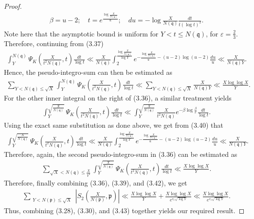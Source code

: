 \documentclass[12pt]{article}
\numberwithin{equation}{section}
\numberwithin{equation}{section}
\begin{document}
\begin{proof}
\begin{align}
     \beta = u-2;\quad t = e^{\frac{\log \frac{X}{N(\mathfrak{q})}}{u}};\quad  du = -\log \frac{X}{N(\mathfrak{q})}\frac{dt}{t(\log t)^2}. \nonumber
\end{align}
Note here that the asymptotic bound is uniform for $Y<t\leq N(\mathfrak{q})$, for $\varepsilon=\frac{2}{3}$. Therefore, continuing from (3.37)
 \begin{align}
     \int_Y^{N(\mathfrak{q})} \Psi_K\left(\frac{X}{t^2N(\mathfrak{q})},t\right)\frac{dt}{\log t} \ll \frac{X}{N(\mathfrak{q})}\int_2^{\frac{\log \frac{X}{N(\mathfrak{q})}}{\log Y}} e^{-\frac{\log \frac{X}{N(\mathfrak{q})}}{u}-(u-2)\log(u-2)}\frac{du}{u} \ll \frac{X}{N(\mathfrak{q})Y}.
 \end{align}
Hence, the pseudo-integro-sum can then be estimated as
\begin{eqnarray}
    \sum_{Y<N(\mathfrak{q})\leq \sqrt{X}} \int_Y^{N(\mathfrak{q})} \Psi_K\left(\frac{X}{t^2N(\mathfrak{q})},t\right)\frac{dt}{\log t} \ll \sum_{Y<N(\mathfrak{q}) \leq \sqrt{X}} \frac{X}{N(\mathfrak{q})Y} \ll \frac{X\log\log X}{Y}.
\end{eqnarray}
For the other inner integral on the right of (3.36), a similar treatment yields
\begin{align}
    \int_Y^{\sqrt{\frac{X}{N(\mathfrak{q})} } } \Psi_K\left(\frac{X}{t^2N(\mathfrak{q})},t\right)\frac{dt}{\log t} \ll \int_{Y}^{\sqrt{\frac{X}{N(\mathfrak{q})}}} \frac{X}{t^2N(\mathfrak{q})}e^{-\beta\log\frac{\beta}{e}}\frac{dt}{\log t}.
\end{align}
Using the exact same substitution as done above, we get from (3.40) that
\begin{align}
    \int_Y^{\sqrt{\frac{X}{N(\mathfrak{q})} } } \Psi_K\left(\frac{X}{t^2N(\mathfrak{q})},t\right)\frac{dt}{\log t} \ll \frac{X}{N(\mathfrak{q})}\int_2^{\frac{\log \frac{X}{N(\mathfrak{q})}}{\log Y}} e^{-\frac{\log \frac{X}{N(\mathfrak{q})}}{u}-(u-2)\log(u-2)}\frac{du}{u} \ll \frac{X}{N(\mathfrak{q})Y}.
\end{align}
Therefore, again, the second pseudo-integro-sum in (3.36) can be estimated as
\begin{align}
     \sum_{\sqrt{X}<N(\mathfrak{q})\leq \frac{X}{Y^2}} \int_Y^{\sqrt{\frac{X}{N(\mathfrak{q})} } } \Psi_K\left(\frac{X}{t^2N(\mathfrak{q})},t\right)\frac{dt}{\log t} \ll \frac{X\log\log X}{Y}.
\end{align}
Therefore, finally combining (3.36), (3.39), and (3.42), we get 
\begin{align}
     \sum_{\substack{Y<N(\mathfrak{p}) \leq \sqrt{X} }} \left|S_2\left(\frac{X}{N(\mathfrak{p})},\mathfrak{p}\right)\right| \ll \frac{X\log\log X}{Y}+\frac{X\log\log X}{e^{c_1\sqrt{\log Y}}} \ll \frac{X\log\log X}{e^{c_1\sqrt{\log Y}}}.
\end{align}
Thus, combining (3.28), (3.30), and (3.43) together yields our required result.   
\end{proof}
\end{document}
